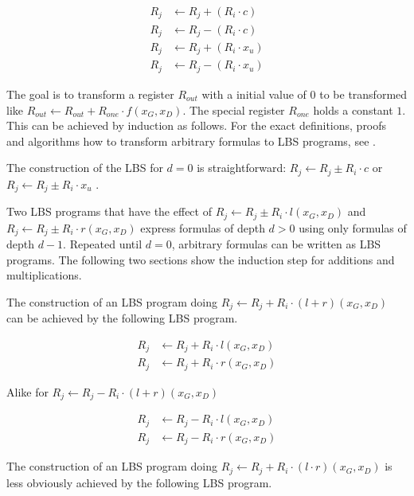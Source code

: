 \begin{align*}
R_j & \leftarrow R_j + (R_i \cdot c) \\
R_j & \leftarrow R_j - (R_i \cdot c) \\
R_j & \leftarrow R_j + (R_i \cdot x_u) \\
R_j & \leftarrow R_j - (R_i \cdot x_u)
\end{align*}



The goal is to transform a register $R_{out}$ with a initial value of $0$ to be
transformed like $R_{out} \leftarrow R_{out} + R_{one} \cdot f(x_G,x_D)$. The
special register $R_{one}$ holds a constant $1$. This can be achieved by
induction as follows.  For the exact definitions, proofs and algorithms how to
transform arbitrary formulas to LBS programs, see \cite{cleve91}.



The construction of the LBS for $d = 0$ is straightforward:
$R_j \leftarrow R_j \pm R_i \cdot c$ or $R_j \leftarrow R_j \pm R_i \cdot x_u$ .



Two LBS programs that have the effect of $R_j \leftarrow R_j \pm R_i \cdot
l(x_G, x_D)$  and $R_j \leftarrow R_j \pm R_i \cdot r(x_G, x_D)$ express
formulas of depth $d > 0$ using only formulas of depth $d - 1$. Repeated
until $d = 0$, arbitrary formulas can be written as LBS programs. The following
two sections show the induction step for additions and multiplications.

 The construction of an LBS program doing $R_j \leftarrow R_j
+ R_i \cdot (l + r)(x_G, x_D)$ can be achieved by the following LBS program.

\begin{align*}
R_j & \leftarrow R_j + R_i \cdot l(x_G, x_D) \\
R_j & \leftarrow R_j + R_i \cdot r(x_G, x_D)
\end{align*}

Alike for $R_j \leftarrow R_j - R_i \cdot (l + r)(x_G, x_D)$

\begin{align*}
R_j & \leftarrow R_j - R_i \cdot l(x_G, x_D) \\
R_j & \leftarrow R_j - R_i \cdot r(x_G, x_D)
\end{align*}


 The construction of an LBS program doing $R_j
\leftarrow R_j + R_i \cdot (l \cdot r)(x_G, x_D)$ is less obviously achieved by
the following LBS program.

